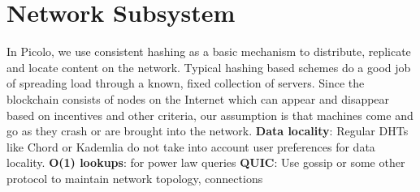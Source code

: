 \documentclass[preprint,12pt]{elsarticle}
\begin{document}
\section{Network Subsystem} 
In Picolo, we use consistent hashing as a basic mechanism to distribute, replicate and locate content on the network.
Typical hashing based schemes do a good job of spreading load through a known, fixed collection of servers. Since the
blockchain consists of nodes on the Internet which can appear and disappear based on incentives and other criteria, our
assumption is that machines come and go as they crash or are brought into the network.
\newline
\newline
\textbf{Data locality}: Regular DHTs like Chord or Kademlia do not take into account user preferences for data locality. 
\newline
\newline
\textbf{O(1) lookups}:  for power law queries
\newline
\newline
\textbf{QUIC}: Use gossip or some other protocol to maintain network topology, connections


\end{document}
